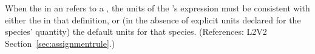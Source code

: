 When the  in an \InitialAssignment refers to a \Species,
the units of the \InitialAssignment's  expression must be
consistent with either the  in that \Species definition, or
(in the absence of explicit units declared for the species' quantity) the
default units for that species.  (References: L2V2
Section~\ref{sec:assignmentrule}.)
